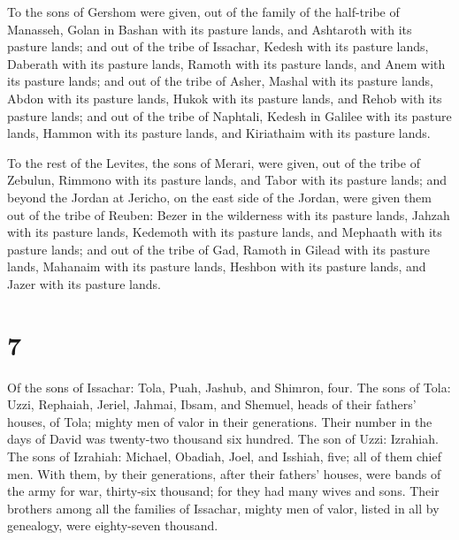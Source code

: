  To the sons of Gershom were given, out of the family of
the half-tribe of Manasseh, Golan in Bashan with its pasture lands, and
Ashtaroth with its pasture lands;  and out of the tribe
of Issachar, Kedesh with its pasture lands, Daberath with its pasture
lands,  Ramoth with its pasture lands, and Anem with its
pasture lands;  and out of the tribe of Asher, Mashal
with its pasture lands, Abdon with its pasture lands, 
Hukok with its pasture lands, and Rehob with its pasture lands;
 and out of the tribe of Naphtali, Kedesh in Galilee with
its pasture lands, Hammon with its pasture lands, and Kiriathaim with
its pasture lands.

 To the rest of the Levites, the sons of Merari, were
given, out of the tribe of Zebulun, Rimmono with its pasture lands, and
Tabor with its pasture lands;  and beyond the Jordan at
Jericho, on the east side of the Jordan, were given them out of the
tribe of Reuben: Bezer in the wilderness with its pasture lands, Jahzah
with its pasture lands,  Kedemoth with its pasture lands,
and Mephaath with its pasture lands;  and out of the
tribe of Gad, Ramoth in Gilead with its pasture lands, Mahanaim with its
pasture lands,  Heshbon with its pasture lands, and Jazer
with its pasture lands.

\hypertarget{section-6}{%
\section{7}\label{section-6}}

 Of the sons of Issachar: Tola, Puah, Jashub, and Shimron,
four.  The sons of Tola: Uzzi, Rephaiah, Jeriel, Jahmai,
Ibsam, and Shemuel, heads of their fathers' houses, of Tola; mighty men
of valor in their generations. Their number in the days of David was
twenty-two thousand six hundred.  The son of Uzzi:
Izrahiah. The sons of Izrahiah: Michael, Obadiah, Joel, and Isshiah,
five; all of them chief men.  With them, by their
generations, after their fathers' houses, were bands of the army for
war, thirty-six thousand; for they had many wives and sons.
 Their brothers among all the families of Issachar, mighty
men of valor, listed in all by genealogy, were eighty-seven thousand.

